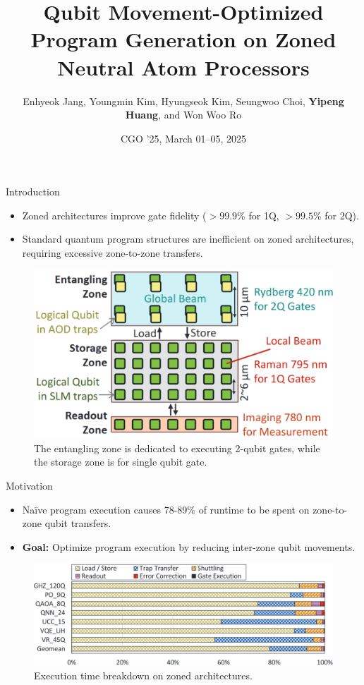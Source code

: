 \documentclass{beamer}
\title{Qubit Movement-Optimized Program Generation on Zoned Neutral Atom Processors}
\author{Enhyeok Jang, Youngmin Kim, Hyungseok Kim, Seungwoo Choi, \textbf{Yipeng Huang}, and Won Woo Ro}
\institute{Yonsei University, Rutgers University}
\date{CGO ’25, March 01–05, 2025}
\begin{document}
	
	\frame{\titlepage}
	
	\begin{frame}{Introduction}
		\begin{itemize}
			\item Zoned architectures improve gate fidelity ($>99.9\%$ for 1Q, $>99.5\%$ for 2Q).
			\item Standard quantum program structures are inefficient on zoned architectures, requiring excessive zone-to-zone transfers.
			
		\end{itemize}
		\begin{figure}
			\centering
			\includegraphics[width=.8\textwidth]{figure/zone.png}
			\caption{The entangling zone is dedicated to executing 2-qubit gates, while the storage zone is for single qubit gate.}
		\end{figure}
	\end{frame}
	
	\begin{frame}{Motivation}
		\begin{itemize}
			\item Naïve program execution causes 78-89\% of runtime to be spent on zone-to-zone qubit transfers.
			\item \textbf{Goal:} Optimize program execution by reducing inter-zone qubit movements.
		\end{itemize}
		\begin{figure}
			\centering
			\includegraphics[width=.8\textwidth]{figure/intro.png}
			\caption{Execution time breakdown on zoned architectures.}
		\end{figure}
	\end{frame}
	
\end{document}
